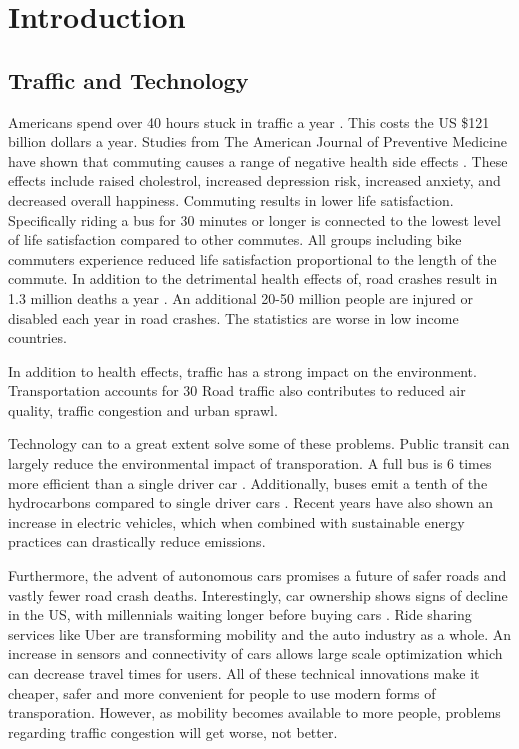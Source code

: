\chapter{Introduction}

\section{Traffic and Technology}


Americans spend over 40 hours stuck in traffic a year \cite{traffic}.
This costs the US \$121 billion dollars a year.
Studies from The American Journal of Preventive Medicine have shown that commuting causes a range of negative health side effects \cite{trafficandhealth}.
These effects include raised cholestrol, increased depression risk, increased anxiety, and decreased overall happiness.
Commuting results in lower life satisfaction.
Specifically riding a bus for 30 minutes or longer is connected to the lowest level of life satisfaction compared to other commutes.
All groups including bike commuters experience reduced life satisfaction proportional to the length of the commute.
In addition to the detrimental health effects of, road crashes result in 1.3 million deaths a year \cite{trafficdeaths}.
An additional 20-50 million people are injured or disabled each year in road crashes.
The statistics are worse in low income countries.


In addition to health effects, traffic has a strong impact on the environment.
Transportation accounts for 30%
Road traffic also contributes to reduced air quality, traffic congestion and urban sprawl.


Technology can to a great extent solve some of these problems.
Public transit can largely reduce the environmental impact of transporation.
A full bus is 6 times more efficient than a single driver car \cite{trafficenv}.
Additionally, buses emit a tenth of the hydrocarbons compared to single driver cars \cite{trafficenv}.
Recent years have also shown an increase in electric vehicles, which when combined with sustainable energy practices can drastically reduce emissions.

Furthermore, the advent of autonomous cars promises a future of safer roads and vastly fewer road crash deaths.
Interestingly, car ownership shows signs of decline in the US, with millennials waiting longer before buying cars \cite{cars}.
Ride sharing services like Uber are transforming mobility and the auto industry as a whole.
An increase in sensors and connectivity of cars allows large scale optimization which can decrease travel times for users.
All of these technical innovations make it cheaper, safer and more convenient for people to use modern forms of transporation.
However, as mobility becomes available to more people, problems regarding traffic congestion will get worse, not better.

